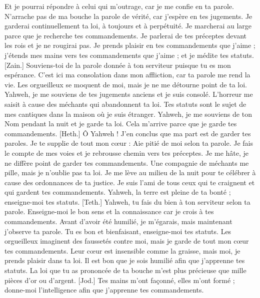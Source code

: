 \begin{multicols}{2}
Et je pourrai répondre à celui qui m’outrage, car je me confie en ta parole.
N'arrache pas de ma bouche la parole de vérité, car j’espère en tes jugements.
Je garderai continuellement ta loi, à toujours et à perpétuité.
Je marcherai au large parce que je recherche tes commandements.
Je parlerai de tes préceptes devant les rois et je ne rougirai pas.
Je prends plaisir en tes commandements que j’aime ;
j'étends mes mains vers tes commandements que j'aime ; et je médite tes statuts.
[Zain.] Souviens-toi de la parole donnée à ton serviteur puisque tu es mon espérance.
C'est ici ma consolation dans mon affliction, car ta parole me rend la vie.
Les orgueilleux se moquent de moi, mais je ne me détourne point de ta loi.
Yahweh, je me souviens de tes jugements anciens et je suis consolé.
L'horreur me saisit à cause des méchants qui abandonnent ta loi.
Tes statuts sont le sujet de mes cantiques dans la maison où je suis étranger.
Yahweh, je me souviens de ton Nom pendant la nuit et je garde ta loi.
Cela m'arrive parce que je garde tes commandements.
[Heth.] Ô Yahweh ! J’en conclus que ma part est de garder tes paroles.
Je te supplie de tout mon cœur : Aie pitié de moi selon ta parole.
Je fais le compte de mes voies et je rebrousse chemin vers tes préceptes.
Je me hâte, je ne diffère point de garder tes commandements.
Une compagnie de méchants me pille, mais je n'oublie pas ta loi.
Je me lève au milieu de la nuit pour te célébrer à cause des ordonnances de ta justice.
Je suis l’ami de tous ceux qui te craignent et qui gardent tes commandements.
Yahweh, la terre est pleine de ta bonté ; enseigne-moi tes statuts.
[Teth.] Yahweh, tu fais du bien à ton serviteur selon ta parole.
Enseigne-moi le bon sens et la connaissance car je crois à tes commandements.
Avant d’avoir été humilié, je m’égarais, mais maintenant j'observe ta parole.
Tu es bon et bienfaisant, enseigne-moi tes statuts.
Les orgueilleux imaginent des faussetés contre moi, mais je garde de tout mon cœur tes commandements.
Leur cœur est insensible comme la graisse, mais moi, je prends plaisir dans ta loi.
Il est bon que je sois humilié afin que j'apprenne tes statuts.
La loi que tu as prononcée de ta bouche m'est plus précieuse que mille pièces d'or ou d'argent.
[Jod.] Tes mains m'ont façonné, elles m’ont formé ; donne-moi l’intelligence afin que j'apprenne tes commandements.

\end{multicols}
